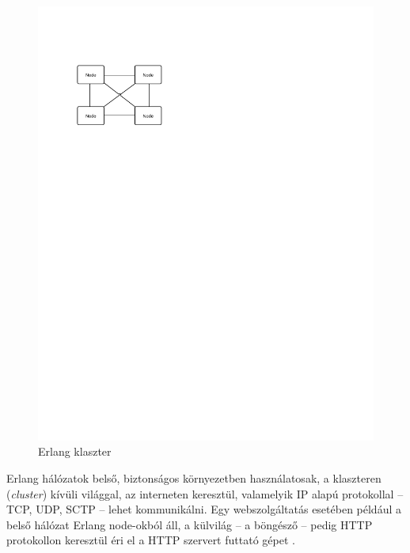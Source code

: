 \documentclass[12pt, a4paper, oneside]{book}
\begin{document}
\begin{figure}
\caption{Erlang klaszter}
\includegraphics[clip=true, trim= 0 20cm 0 3cm]{fig/Nodes.pdf}
\end{figure}

Erlang hálózatok belső, biztonságos környezetben használatosak, a klaszteren
(\emph{cluster}) kívüli világgal, az interneten keresztül, valamelyik IP alapú
protokollal -- TCP, UDP, SCTP -- lehet kommunikálni. Egy webszolgáltatás
esetében például a belső hálózat Erlang node-okból áll, a külvilág -- a
böngésző -- pedig HTTP protokollon keresztül éri el a HTTP szervert futtató
gépet \citep{ArmstrongThesis}. 
\end{document}
